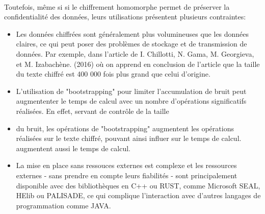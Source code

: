 \documentclass{article}
\begin{document}
$ $\\
Toutefois, même si si le chiffrement homomorphe permet de préserver la confidentialité des données, leurs utilisations présentent plusieurs contraintes:
\begin{itemize}
    \item Les données chiffrées sont généralement plus volumineuses que les données claires, ce qui peut poser des problèmes de stockage et de transmission de données. Par exemple,
    dans l'article de I. Chillotti, N. Gama, M. Georgieva, et M. Izabachène. (2016) \cite{end_size} où on apprend en conclusion de l'article que la taille du texte chiffré est 400 000 fois plus grand que celui d'origine.
    \item L'utilisation de "bootstrapping" \cite{boots} pour limiter l'accumulation de bruit peut augmententer le temps de calcul avec un nombre d'opérations significatifs réalisées. En effet, servant de contrôle de la taille 
    \item du bruit, les opérations de "bootstrapping" augmentent les opérations réalisées sur le texte chiffré, pouvant ainsi influer sur le temps de calcul.
    augmentent aussi le temps de calcul.
    \item La mise en place sans ressouces externes est complexe et les ressources externes - sans prendre en compte leurs fiabilités - sont principalement disponible avec des bibliothèques
     en C++ ou RUST, comme Microsoft SEAL, HElib ou PALISADE, ce qui complique l'interaction avec d'autres langages de programmation comme JAVA.
\end{itemize}
\end{document}
